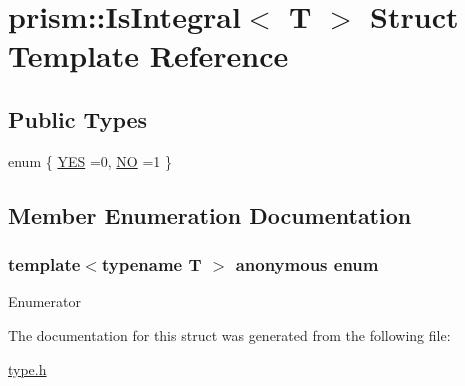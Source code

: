 \hypertarget{structprism_1_1_is_integral}{}\section{prism\+:\+:Is\+Integral$<$ T $>$ Struct Template Reference}
\label{structprism_1_1_is_integral}
\subsection*{Public Types}
\begin{DoxyCompactItemize}
\item 
enum \{ \hyperlink{structprism_1_1_is_integral_a4a62046c0d8ffbae52d4fd26c65add60a493300b753d66132b089678290335669}{Y\+ES} =0, 
\hyperlink{structprism_1_1_is_integral_a4a62046c0d8ffbae52d4fd26c65add60abb39c55db0d59caea7b7f7f711a069e3}{NO} =1
 \}
\end{DoxyCompactItemize}


\subsection{Member Enumeration Documentation}
\subsubsection[{\texorpdfstring{anonymous enum}{anonymous enum}}]{\setlength{\rightskip}{0pt plus 5cm}template$<$typename T $>$ anonymous enum}\hypertarget{structprism_1_1_is_integral_a4a62046c0d8ffbae52d4fd26c65add60}{}\label{structprism_1_1_is_integral_a4a62046c0d8ffbae52d4fd26c65add60}
\begin{Desc}
\item[Enumerator]\par
\begin{description}
\item[{\em 
Y\+ES\hypertarget{structprism_1_1_is_integral_a4a62046c0d8ffbae52d4fd26c65add60a493300b753d66132b089678290335669}{}\label{structprism_1_1_is_integral_a4a62046c0d8ffbae52d4fd26c65add60a493300b753d66132b089678290335669}
}]\item[{\em 
NO\hypertarget{structprism_1_1_is_integral_a4a62046c0d8ffbae52d4fd26c65add60abb39c55db0d59caea7b7f7f711a069e3}{}\label{structprism_1_1_is_integral_a4a62046c0d8ffbae52d4fd26c65add60abb39c55db0d59caea7b7f7f711a069e3}
}]\end{description}
\end{Desc}


The documentation for this struct was generated from the following file\+:\begin{DoxyCompactItemize}
\item 
\hyperlink{type_8h}{type.\+h}\end{DoxyCompactItemize}
